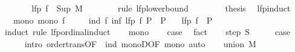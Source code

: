 \begin{isabellebody}
\ \ \ \ \isamarkupfalse%
\ \isamarkupfalse%
\ {\isachardoublequoteopen}lfp\ f\ {\isasymle}\ Sup\ {\isacharquery}{\kern0pt}M{\isachardoublequoteclose}\isanewline
\ \ \ \ \ \ \isamarkupfalse%
\ {\isacharparenleft}{\kern0pt}rule\ lfp{\isacharunderscore}{\kern0pt}lowerbound{\isacharparenright}{\kern0pt}\isanewline
\ \ \isamarkupfalse%
\isanewline
\ \ \isamarkupfalse%
\ \isamarkupfalse%
\ {\isacharquery}{\kern0pt}thesis\ \isacommand{{\isachardot}{\kern0pt}}\isamarkupfalse%
\isanewline
{}\isamarkupfalse%
%
\endisatagproof
{\isafoldproof}%
%
\isadelimproof
\isanewline
%
\endisadelimproof
\isanewline
{}\isamarkupfalse%
\ lfp{\isacharunderscore}{\kern0pt}induct{\isacharcolon}{\kern0pt}\isanewline
\ \ \ mono{\isacharcolon}{\kern0pt}\ {\isachardoublequoteopen}mono\ f{\isachardoublequoteclose}\isanewline
\ \ \ \ \ ind{\isacharcolon}{\kern0pt}\ {\isachardoublequoteopen}f\ {\isacharparenleft}{\kern0pt}inf\ {\isacharparenleft}{\kern0pt}lfp\ f{\isacharparenright}{\kern0pt}\ P{\isacharparenright}{\kern0pt}\ {\isasymle}\ P{\isachardoublequoteclose}\isanewline
\ \ \ {\isachardoublequoteopen}lfp\ f\ {\isasymle}\ P{\isachardoublequoteclose}\isanewline
%
\isadelimproof
%
\endisadelimproof
%
\isatagproof
{}\isamarkupfalse%
\ {\isacharparenleft}{\kern0pt}induct\ rule{\isacharcolon}{\kern0pt}\ lfp{\isacharunderscore}{\kern0pt}ordinal{\isacharunderscore}{\kern0pt}induct{\isacharparenright}{\kern0pt}\isanewline
\ \ \isamarkupfalse%
\ mono\isanewline
\ \ \isamarkupfalse%
\ {\isacharquery}{\kern0pt}case\ \isamarkupfalse%
\ fact\isanewline
{}\isamarkupfalse%
\isanewline
\ \ \isamarkupfalse%
\ {\isacharparenleft}{\kern0pt}step\ S{\isacharparenright}{\kern0pt}\isanewline
\ \ \isamarkupfalse%
\ \isamarkupfalse%
\ {\isacharquery}{\kern0pt}case\isanewline
\ \ \ \ \isamarkupfalse%
\ {\isacharparenleft}{\kern0pt}intro\ order{\isacharunderscore}{\kern0pt}trans{\isacharbrackleft}{\kern0pt}OF\ {\isacharunderscore}{\kern0pt}\ ind{\isacharbrackright}{\kern0pt}\ monoD{\isacharbrackleft}{\kern0pt}OF\ mono{\isacharbrackright}{\kern0pt}{\isacharparenright}{\kern0pt}\ auto\isanewline
{}\isamarkupfalse%
\isanewline
\ \ \isamarkupfalse%
\ {\isacharparenleft}{\kern0pt}union\ M{\isacharparenright}{\kern0pt}\isanewline
\ \ \isamarkupfalse%

\end{isabellebody}
